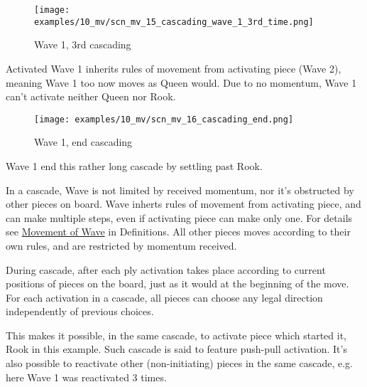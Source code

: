 \vspace*{0.245\textheight}
\noindent
\begin{wrapfigure}[9]{r}{0.5625\textwidth}
\centering
\texttt{[image: examples/10\_mv/scn\_mv\_15\_cascading\_wave\_1\_3rd\_time.png]}
\caption{Wave 1, 3rd cascading}
\label{fig:scn_mv_15_cascading_wave_1_3rd_time}
\end{wrapfigure}
Activated Wave 1 inherits rules of movement from activating piece (Wave 2),
meaning Wave 1 too now moves as Queen would. Due to no momentum, Wave 1 can't
activate neither Queen nor Rook.

\clearpage %

\noindent
\begin{wrapfigure}[3]{l}{0.5625\textwidth}
\centering
\texttt{[image: examples/10\_mv/scn\_mv\_16\_cascading\_end.png]}
\caption{Wave 1, end cascading}
\label{fig:scn_mv_16_cascading_end}
\end{wrapfigure}
Wave 1 end this rather long cascade by settling past Rook.

\vspace*{0.345\textheight}
In a cascade, Wave is not limited by received momentum, nor it's obstructed by
other pieces on board. Wave inherts rules of movement from activating piece,
and can make multiple steps, even if activating piece can make only one.
For details see \hyperref[sec:Appendix/Movement of Wave]{Movement of Wave}
in Definitions. All other pieces moves according to their own rules, and are
restricted by momentum received.

During cascade, after each ply activation takes place according to current
positions of pieces on the board, just as it would at the beginning of the move.
For each activation in a cascade, all pieces can choose any legal direction
independently of previous choices.

This makes it possible, in the same cascade, to activate piece which started it,
Rook in this example. Such cascade is said to feature push-pull activation.
It's also possible to reactivate other (non-initiating) pieces in the same
cascade, e.g. here Wave 1 was reactivated 3 times.

\clearpage %

